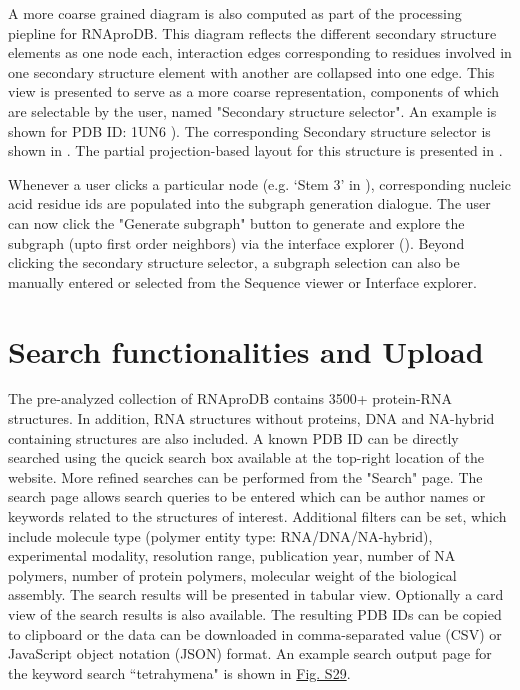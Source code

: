 A more coarse grained diagram is also computed as part of the processing piepline for RNAproDB. This diagram reflects the different secondary structure elements as one node each, interaction edges corresponding to residues involved in one secondary structure element with another are collapsed into one edge. This view is presented to serve as a more coarse representation, components of which are selectable by the user, named "Secondary structure selector". An example is shown for PDB ID: 1UN6 ). The corresponding Secondary structure selector is shown in . The partial projection-based layout for this structure is presented in . 

Whenever a user clicks a particular node (e.g. `Stem 3' in ), corresponding nucleic acid residue ids are populated into the subgraph generation dialogue. The user can now click the "Generate subgraph" button to generate and explore the subgraph (upto first order neighbors) via the interface explorer (). Beyond clicking the secondary structure selector, a subgraph selection can also be manually entered or selected from the Sequence viewer or Interface explorer. 

\section{Search functionalities and Upload}

The pre-analyzed collection of RNAproDB contains 3500+ protein-RNA structures. In addition, RNA structures without proteins, DNA and NA-hybrid containing structures are also included. A known PDB ID can be directly searched using the qucick search box available at the top-right location of the website. More refined searches can be performed from the "Search" page. The search page allows search queries to be entered which can be author names or keywords related to the structures of interest. Additional filters can be set, which include molecule type (polymer entity type: RNA/DNA/NA-hybrid), experimental modality, resolution range, publication year, number of NA polymers, number of protein polymers, molecular weight of the biological assembly. The search results will be presented in tabular view. Optionally a card view of the search results is also available. The resulting PDB IDs can be copied to clipboard or the data can be downloaded in comma-separated value (CSV) or JavaScript object notation (JSON) format. An example search output page for the keyword search ``tetrahymena" is shown in \hyperref[fig:rnaprodbS1]{Fig. S29}.

